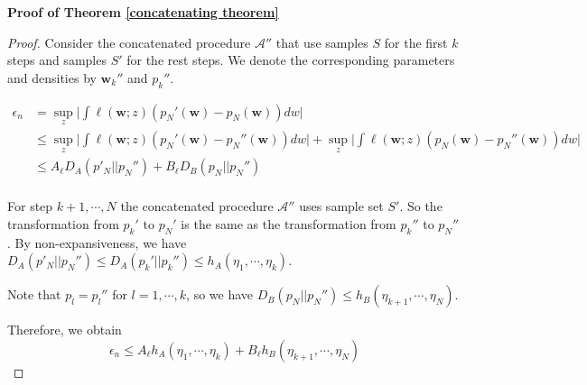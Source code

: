 \documentclass[final,12pt]{colt2018} %
\begin{document}
\noindent \textbf{Proof of Theorem \ref{concatenating theorem}}
\begin{proof}
  Consider the concatenated procedure $\mathcal{A}''$ that use samples $S$ for the first $k$ steps and samples $S'$ for the rest steps. We denote the corresponding parameters and densities by $\bm{w}_k''$ and $p_k''$.

  \begin{align*}
  \epsilon_n&=\sup\limits_{z}\Big|\int \ell(\bm{w};z)(p_N'(\bm{w})-p_N(\bm{w}))dw\Big|\\
  &\le \sup\limits_{z}\Big|\int \ell(\bm{w};z)(p_N'(\bm{w})-p_N''(\bm{w}))dw\Big|+ \sup\limits_{z}\Big|\int \ell(\bm{w};z)(p_N(\bm{w})-p_N''(\bm{w}))dw\Big|\\
  &\le A_\ell D_A(p'_N||p_N'')+ B_\ell D_B(p_N||p_N'')\\
  \end{align*}

  For step $k+1,\cdots,N$ the concatenated procedure $\mathcal{A}''$ uses sample set $S'$. So the transformation from $p_k'$ to $p_N'$ is the same as the transformation from $p_k''$ to $p_N''$. By non-expansiveness, we have $D_A(p'_N||p_N'')\le D_A(p_k'||p_k'')\le h_A(\eta_1,\cdots,\eta_k)$.

  Note that $p_l=p_l''$ for $l=1,\cdots, k$, so we have $D_B(p_N||p_N'')\le h_B(\eta_{k+1},\cdots, \eta_N)$.

  Therefore, we obtain
  \begin{equation}
    \epsilon_n  \le A_\ell h_A(\eta_1,\cdots, \eta_k)+ B_\ell h_B(\eta_{k+1},\cdots, \eta_N)
  \end{equation}
  
\end{proof}
\end{document}
